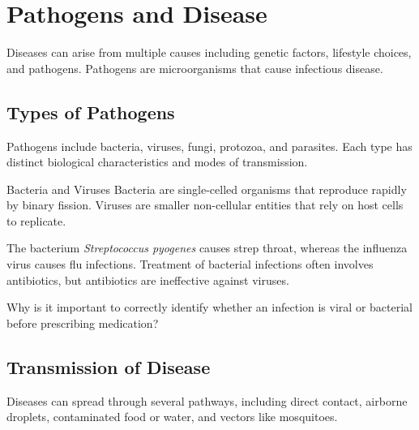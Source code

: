 \section{Pathogens and Disease}

Diseases can arise from multiple causes including genetic factors, lifestyle choices, and pathogens. Pathogens are microorganisms that cause infectious disease.

\subsection{Types of Pathogens}

Pathogens include bacteria, viruses, fungi, protozoa, and parasites. Each type has distinct biological characteristics and modes of transmission.


\begin{keyconcept}{Bacteria and Viruses}
Bacteria are single-celled organisms that reproduce rapidly by binary fission. Viruses are smaller non-cellular entities that rely on host cells to replicate.
\end{keyconcept}

\begin{example}
The bacterium \textit{Streptococcus pyogenes} causes strep throat, whereas the influenza virus causes flu infections. Treatment of bacterial infections often involves antibiotics, but antibiotics are ineffective against viruses.
\end{example}

\begin{stopandthink}
Why is it important to correctly identify whether an infection is viral or bacterial before prescribing medication?
\end{stopandthink}

\subsection{Transmission of Disease}

Diseases can spread through several pathways, including direct contact, airborne droplets, contaminated food or water, and vectors like mosquitoes.


